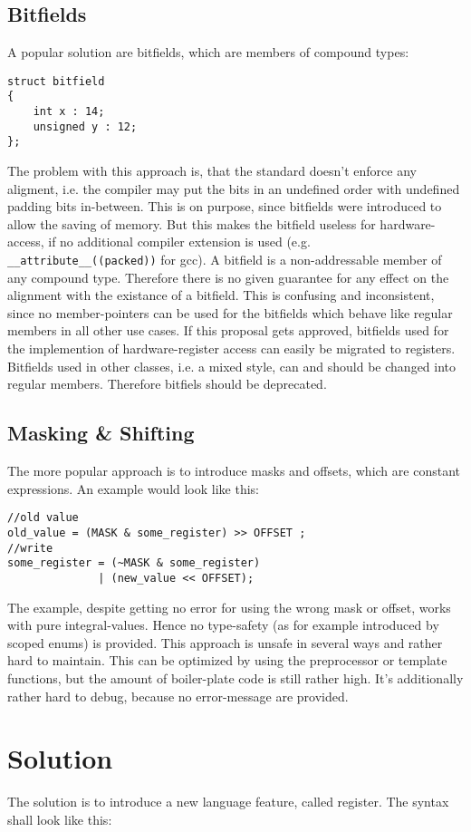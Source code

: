 \documentclass{scrreprt}
\begin{document}
\section{Bitfields}
A popular solution are bitfields, which are members of compound types:
\begin{lstlisting}
struct bitfield
{
	int x : 14;
	unsigned y : 12;
};
\end{lstlisting}
The problem with this approach is, that the standard doesn't enforce any
aligment, i.e. the compiler may put the bits in an undefined order with
undefined padding bits in-between.
This is on purpose, since bitfields were introduced to allow the saving of memory. But this
makes the bitfield useless for hardware-access, if no additional
compiler extension is used (e.g. \lstinline {__attribute__((packed))} for gcc).
A bitfield is a non-addressable member of any compound type. 
Therefore there is no given guarantee for any effect on the alignment with the
existance of a bitfield.
This is confusing and inconsistent, since no member-pointers can be used for
the bitfields which behave like regular members in all other use cases. 
If this proposal gets approved, bitfields used for the implemention of
hardware-register access can easily be migrated to registers. Bitfields used in
other classes, i.e. a mixed style, can and should be changed into regular
members. Therefore bitfiels should be deprecated.
\section{Masking \& Shifting}
The more popular approach is to introduce masks and offsets, which are constant
expressions. 
An example would look like this:
\begin{lstlisting}
//old value
old_value = (MASK & some_register) >> OFFSET ;
//write
some_register = (~MASK & some_register) 
			  | (new_value << OFFSET);  
\end{lstlisting}
The example, despite getting no error for using the wrong mask or offset,
works with pure integral-values. Hence no type-safety (as for example
introduced by scoped enums) is provided.
This approach is unsafe in several ways and rather hard to maintain.
This can be optimized by using the preprocessor or template functions, but the
amount of boiler-plate code is still rather high. It's additionally rather hard
to debug, because no error-message are provided.
\chapter{Solution}
The solution is to introduce a new language feature, called register. The
syntax shall look like this:
\end{document}
